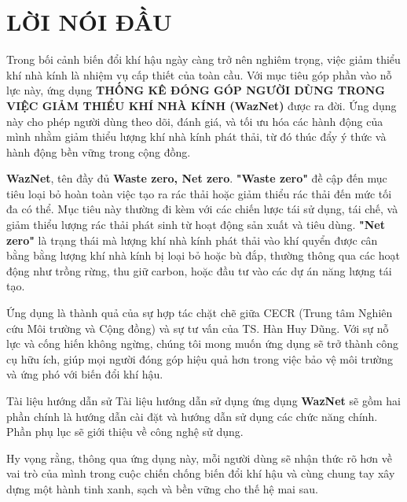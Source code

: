 \section*{LỜI NÓI ĐẦU} %
\thispagestyle{empty}

Trong bối cảnh biến đổi khí hậu ngày càng trở nên nghiêm trọng, việc giảm thiểu khí nhà kính là nhiệm vụ cấp thiết của toàn cầu. Với mục tiêu góp phần vào nỗ lực này, ứng dụng \textbf{THỐNG KÊ ĐÓNG GÓP
NGƯỜI DÙNG TRONG VIỆC GIẢM THIỂU KHÍ NHÀ KÍNH (WazNet)} được ra đời. Ứng dụng này cho phép người dùng theo dõi, đánh giá, và tối ưu hóa các hành động của mình nhằm giảm thiểu lượng khí nhà kính phát thải, từ đó thúc đẩy ý thức và hành động bền vững trong cộng đồng.

\textbf{WazNet}, tên đầy đủ \textbf{Waste zero, Net zero}. \textbf{"Waste zero"} đề cập đến mục tiêu loại bỏ hoàn toàn việc tạo ra rác thải hoặc giảm thiểu rác thải đến mức tối đa có thể. Mục tiêu này thường đi kèm với các chiến lược tái sử dụng, tái chế, và giảm thiểu lượng rác thải phát sinh từ hoạt động sản xuất và tiêu dùng. \textbf{"Net zero"} là trạng thái mà lượng khí nhà kính phát thải vào khí quyển được cân bằng bằng lượng khí nhà kính bị loại bỏ hoặc bù đắp, thường thông qua các hoạt động như trồng rừng, thu giữ carbon, hoặc đầu tư vào các dự án năng lượng tái tạo.

Ứng dụng là thành quả của sự hợp tác chặt chẽ giữa CECR (Trung tâm Nghiên cứu Môi trường và Cộng đồng) và sự tư vấn của TS. Hàn Huy Dũng. Với sự nỗ lực và cống hiến không ngừng, chúng tôi mong muốn ứng dụng sẽ trở thành công cụ hữu ích, giúp mọi người đóng góp hiệu quả hơn trong việc bảo vệ môi trường và ứng phó với biến đổi khí hậu.

Tài liệu hướng dẫn sử Tài liệu hướng dẫn sử dụng ứng dụng \textbf{WazNet} sẽ gồm hai phần chính là hướng dẫn cài đặt và hướng dẫn sử dụng các chức năng chính. Phần phụ lục sẽ giới thiệu về công nghệ sử dụng. 

Hy vọng rằng, thông qua ứng dụng này, mỗi người dùng sẽ nhận thức rõ hơn về vai trò của mình trong cuộc chiến chống biến đổi khí hậu và cùng chung tay xây dựng một hành tinh xanh, sạch và bền vững cho thế hệ mai sau.

\cleardoublepage
